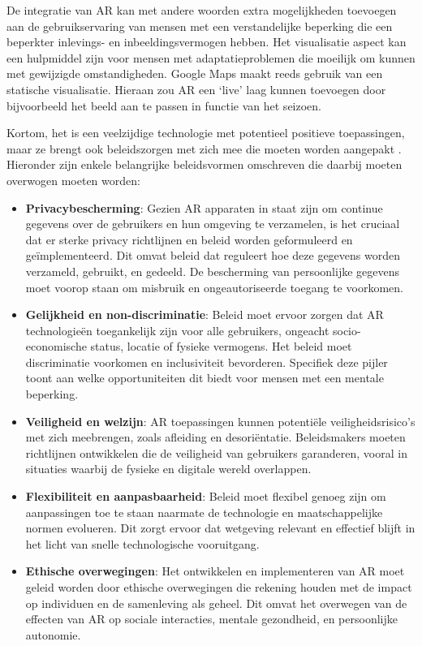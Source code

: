 De integratie van AR kan met andere woorden extra mogelijkheden toevoegen aan de gebruikservaring van mensen met een verstandelijke beperking die een beperkter inlevings- en inbeeldingsvermogen hebben. Het visualisatie aspect kan een hulpmiddel zijn voor mensen met adaptatieproblemen die moeilijk om kunnen met gewijzigde omstandigheden. Google Maps maakt reeds gebruik van een statische visualisatie. Hieraan zou AR een `live' laag kunnen toevoegen door bijvoorbeeld het beeld aan te passen in functie van het seizoen.

Kortom, het is een veelzijdige technologie met potentieel positieve toepassingen, maar ze brengt ook beleidszorgen met zich mee die moeten worden aangepakt \autocite{Calo2015}. Hieronder zijn enkele belangrijke beleidsvormen omschreven die daarbij moeten overwogen moeten worden:  

\begin{itemize}
    \item \textbf{Privacybescherming}: Gezien AR apparaten in staat zijn om continue gegevens over de gebruikers en hun omgeving te verzamelen, is het cruciaal dat er sterke privacy richtlijnen en beleid worden geformuleerd en geïmplementeerd. Dit omvat beleid dat reguleert hoe deze gegevens worden verzameld, gebruikt, en gedeeld. De bescherming van persoonlijke gegevens moet voorop staan om misbruik en ongeautoriseerde toegang te voorkomen.
    \item \textbf{Gelijkheid en non-discriminatie}: Beleid moet ervoor zorgen dat AR technologieën toegankelijk zijn voor alle gebruikers, ongeacht socio-economische status, locatie of fysieke vermogens. Het beleid moet discriminatie voorkomen en inclusiviteit bevorderen. Specifiek deze pijler toont aan welke opportuniteiten dit biedt voor mensen met een mentale beperking.
    \item \textbf{Veiligheid en welzijn}: AR toepassingen kunnen potentiële veiligheidsrisico's met zich meebrengen, zoals afleiding en desoriëntatie. Beleidsmakers moeten richtlijnen ontwikkelen die de veiligheid van gebruikers garanderen, vooral in situaties waarbij de fysieke en digitale wereld overlappen.
    \item \textbf{Flexibiliteit en aanpasbaarheid}: Beleid moet flexibel genoeg zijn om aanpassingen toe te staan naarmate de technologie en maatschappelijke normen evolueren. Dit zorgt ervoor dat wetgeving relevant en effectief blijft in het licht van snelle technologische vooruitgang.
    \item \textbf{Ethische overwegingen}: Het ontwikkelen en implementeren van AR moet geleid worden door ethische overwegingen die rekening houden met de impact op individuen en de samenleving als geheel. Dit omvat het overwegen van de effecten van AR op sociale interacties, mentale gezondheid, en persoonlijke autonomie.
\end{itemize}

